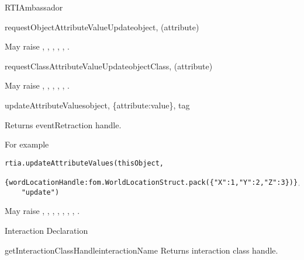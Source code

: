 \begin{classdesc}{RTIAmbassador}{}
\begin{methoddesc}{requestObjectAttributeValueUpdate}{object, (attribute)}

May raise
,
,
,
,
,
.
\end{methoddesc}

\begin{methoddesc}{requestClassAttributeValueUpdate}{objectClass, (attribute)}

May raise
,
,
,
,
,
.
\end{methoddesc}

\begin{methoddesc}{updateAttributeValues}{object, \{attribute:value\}, tag}

Returns eventRetraction handle.

For example
\begin{verbatim} 
rtia.updateAttributeValues(thisObject,
    {wordLocationHandle:fom.WorldLocationStruct.pack({"X":1,"Y":2,"Z":3})},
    "update")
\end{verbatim}

May raise
,
,
,
,
,
,
,
.
\end{methoddesc}

\begin{hlamsc}{Interaction Declaration}

\nextlevel
{}
\nextlevel
{}
\nextlevel
{}
\nextlevel
{}
\nextlevel[3]
\nextlevel
{}
\nextlevel
{}
\nextlevel
\end{hlamsc}

\begin{methoddesc}{getInteractionClassHandle}{interactionName}
Returns interaction class handle.


\end{methoddesc}
\end{classdesc}
